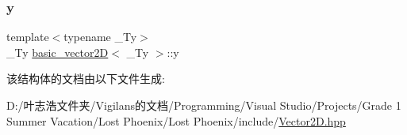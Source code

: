 \mbox{\label{structbasic__vector2_d_ad874ba527147096c9ee6c56ded52be73}} 
\subsubsection{\texorpdfstring{y}{y}}
{\footnotesize\ttfamily template$<$typename \+\_\+\+Ty$>$ \\
\+\_\+\+Ty \hyperlink{structbasic__vector2_d}{basic\+\_\+vector2D}$<$ \+\_\+\+Ty $>$\+::y}



该结构体的文档由以下文件生成\+:\begin{DoxyCompactItemize}
\item 
D\+:/叶志浩文件夹/\+Vigilans的文档/\+Programming/\+Visual Studio/\+Projects/\+Grade 1 Summer Vacation/\+Lost Phoenix/\+Lost Phoenix/include/\hyperlink{_vector2_d_8hpp}{Vector2\+D.\+hpp}\end{DoxyCompactItemize}

